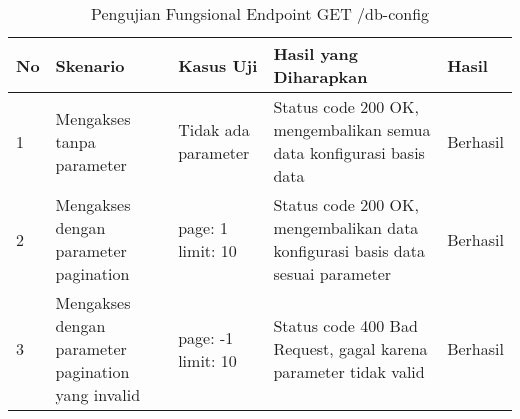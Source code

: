 \begin{table}[H]
    \centering
    \begin{tabular}{|p{0.5cm}|p{3cm}|p{5cm}|p{5cm}|p{1.5cm}|}
        \hline
        \rowcolor[HTML]{DAE8FC} 
        \textbf{No} & \textbf{Skenario} & \textbf{Kasus Uji} & \textbf{Hasil yang Diharapkan} & \textbf{Hasil} \\ \hline
        1 & Mengakses tanpa parameter & 
        Tidak ada parameter & 
        Status code 200 OK, mengembalikan semua data konfigurasi basis data & 
        Berhasil \\ \hline
        2 & Mengakses dengan parameter pagination & 
        page: 1 \newline limit: 10 & 
        Status code 200 OK, mengembalikan data konfigurasi basis data sesuai parameter & 
        Berhasil \\ \hline
        3 & Mengakses dengan parameter pagination yang invalid & 
        page: -1 \newline limit: 10 & 
        Status code 400 Bad Request, gagal karena parameter tidak valid & 
        Berhasil \\ \hline
    \end{tabular}
    \caption{Pengujian Fungsional Endpoint GET /db-config}
    \label{tab:db_config_getall_testing}
\end{table}
